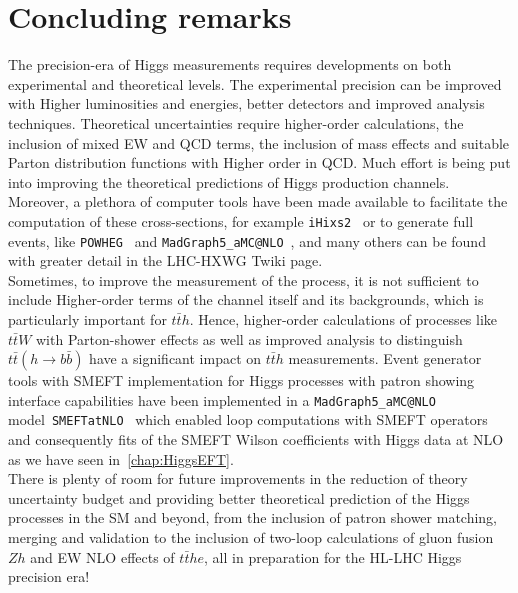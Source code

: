 \section{Concluding remarks \label{sec:singlehiggsconc}  }
The precision-era of Higgs measurements requires developments on both experimental and theoretical levels. The experimental precision can be improved with Higher luminosities and energies, better detectors and improved analysis techniques. Theoretical uncertainties require higher-order calculations, the inclusion of mixed EW and QCD terms, the inclusion of mass effects and suitable Parton distribution functions with Higher order in QCD.  Much effort is being put into improving the theoretical predictions of Higgs production channels. Moreover, a plethora of computer tools have been made available to facilitate the computation of these cross-sections, for example  \texttt{iHixs2}~\cite{Dulat:2018rbf} or to generate full events, like \texttt{POWHEG}~\cite{Alioli:2008tz,Nason:2009ai,Bagnaschi:2011tu,Campbell:2012am,Luisoni:2013cuh,Jager:2014vna,Hartanto:2015uka} and \texttt{MadGraph5\_aMC@NLO}~\cite{Alwall:2014hca}, and many others can be found with greater detail in the LHC-HXWG Twiki page\cite{HXSWG}.  \\ Sometimes, to improve the measurement of the process, it is not sufficient to include Higher-order terms of the channel itself and its backgrounds, which is particularly important for $t\bar th $. Hence, higher-order calculations of processes like $t\bar t W$ with Parton-shower effects as well as improved analysis to distinguish $t\bar t(h \to b \bar b) $ have a significant impact on  $t\bar th $ measurements.
Event generator tools with SMEFT implementation for Higgs processes with patron showing interface capabilities have been implemented in a \texttt{MadGraph5\_aMC@NLO} model~\texttt{SMEFTatNLO}~\cite{Degrande:2020evl} which enabled loop computations with SMEFT operators and consequently fits of the SMEFT Wilson coefficients with Higgs data at NLO as we have seen in~\autoref{chap:HiggsEFT}.\\
There is plenty of room for future improvements in the reduction of theory uncertainty budget and providing better theoretical prediction of the Higgs processes in the SM and beyond, from the inclusion of patron shower matching, merging and validation to the inclusion of two-loop calculations of gluon fusion $Zh$  and EW NLO effects of  $t\bar the $, all in preparation for the HL-LHC Higgs precision era! 



